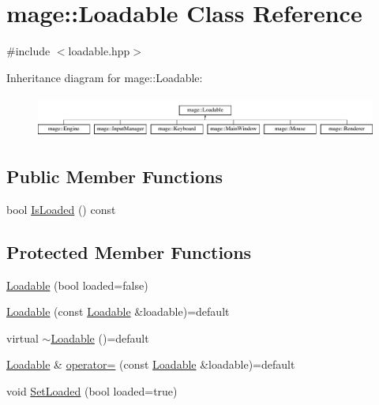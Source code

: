 \hypertarget{classmage_1_1_loadable}{}\section{mage\+:\+:Loadable Class Reference}
\label{classmage_1_1_loadable}


{\ttfamily \#include $<$loadable.\+hpp$>$}

Inheritance diagram for mage\+:\+:Loadable\+:\begin{figure}[H]
\begin{center}
\leavevmode
\includegraphics[height=1.393035cm]{classmage_1_1_loadable}
\end{center}
\end{figure}
\subsection*{Public Member Functions}
\begin{DoxyCompactItemize}
\item 
bool \hyperlink{classmage_1_1_loadable_a53cfa5beb9b44bbcda0d6166a54b8cb6}{Is\+Loaded} () const
\end{DoxyCompactItemize}
\subsection*{Protected Member Functions}
\begin{DoxyCompactItemize}
\item 
\hyperlink{classmage_1_1_loadable_afbdcb287b5e20583899a27a1c244bc7d}{Loadable} (bool loaded=false)
\item 
\hyperlink{classmage_1_1_loadable_a21364449c045d579cb6090347d83cd54}{Loadable} (const \hyperlink{classmage_1_1_loadable}{Loadable} \&loadable)=default
\item 
virtual \hyperlink{classmage_1_1_loadable_a7f51b5e1065ebe4dd1da7ef9c9966546}{$\sim$\+Loadable} ()=default
\item 
\hyperlink{classmage_1_1_loadable}{Loadable} \& \hyperlink{classmage_1_1_loadable_a82277616525b6ed9b1e19fd2dcdb4c0d}{operator=} (const \hyperlink{classmage_1_1_loadable}{Loadable} \&loadable)=default
\item 
void \hyperlink{classmage_1_1_loadable_a932ff8b287c8e68e30a13804cba08ff2}{Set\+Loaded} (bool loaded=true)
\end{DoxyCompactItemize}
